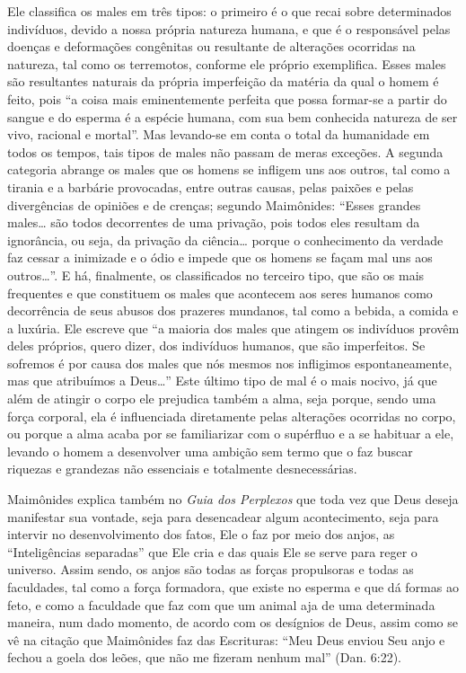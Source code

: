 Ele classifica os males em três tipos: o primeiro é o que recai sobre
determinados indivíduos, devido a nossa própria natureza humana, e que é
o responsável pelas doenças e deformações congênitas ou resultante de
alterações ocorridas na natureza, tal como os terremotos, conforme ele
próprio exemplifica. Esses males são resultantes naturais da própria
imperfeição da matéria da qual o homem é feito, pois ``a coisa mais
eminentemente perfeita que possa formar-se a partir do sangue e do
esperma é a espécie humana, com sua bem conhecida natureza de ser vivo,
racional e mortal''. Mas levando-se em conta o total da humanidade em
todos os tempos, tais tipos de males não passam de meras exceções. A
segunda categoria abrange os males que os homens se infligem uns aos
outros, tal como a tirania e a barbárie provocadas, entre outras causas,
pelas paixões e pelas divergências de opiniões e de crenças; segundo
Maimônides: ``Esses grandes males\ldots{} são todos decorrentes de uma
privação, pois todos eles resultam da ignorância, ou seja, da privação
da ciência\ldots{} porque o conhecimento da verdade faz cessar a inimizade
e o ódio e impede que os homens se façam mal uns aos outros\ldots{}''. E há,
finalmente, os classificados no terceiro tipo, que são os mais
frequentes e que constituem os males que acontecem aos seres humanos
como decorrência de seus abusos dos prazeres mundanos, tal como a
bebida, a comida e a luxúria. Ele escreve que ``a maioria dos males que
atingem os indivíduos provêm deles próprios, quero dizer, dos indivíduos
humanos, que são imperfeitos. Se sofremos é por causa dos males que nós
mesmos nos infligimos espontaneamente, mas que atribuímos a Deus\ldots{}''
Este último tipo de mal é o mais nocivo, já que além de atingir o corpo
ele prejudica também a alma, seja porque, sendo uma força corporal, ela
é influenciada diretamente pelas alterações ocorridas no corpo, ou
porque a alma acaba por se familiarizar com o supérfluo e a se habituar
a ele, levando o homem a desenvolver uma ambição sem termo que o faz
buscar riquezas e grandezas não essenciais e totalmente desnecessárias.

Maimônides explica também no \emph{Guia dos Perplexos} que toda vez que
Deus deseja manifestar sua vontade, seja para desencadear algum
acontecimento, seja para intervir no desenvolvimento dos fatos, Ele o
faz por meio dos anjos, as ``Inteligências separadas'' que Ele cria e
das quais Ele se serve para reger o universo. Assim sendo, os anjos são
todas as forças propulsoras e todas as faculdades, tal como a força
formadora, que existe no esperma e que dá formas ao feto, e como a faculdade que faz com que um animal aja de uma
determinada maneira, num dado momento, de acordo com os desígnios de
Deus, assim como se vê na citação que Maimônides faz das Escrituras:
``Meu Deus enviou Seu anjo e fechou a goela dos leões, que não me
fizeram nenhum mal'' (Dan. 6:22).

